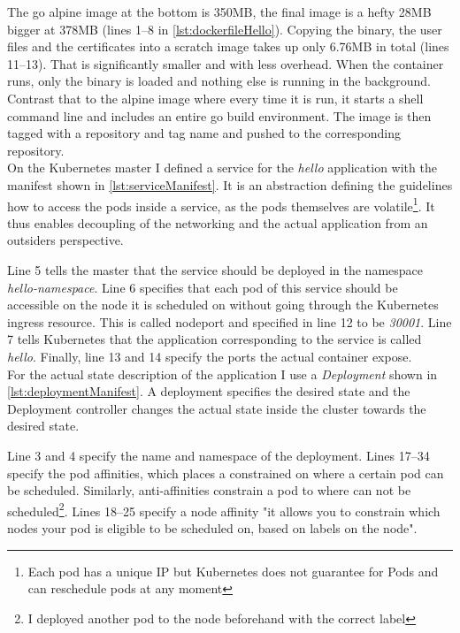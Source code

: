 The go alpine image at the bottom is 350MB, the final image is a hefty 28MB bigger at 378MB (lines 1--8 in \cref{lst:dockerfileHello}). Copying the binary, the user files and the  certificates into a scratch image takes up only 6.76MB in total (lines 11--13). That is significantly smaller and with less overhead. When the container runs, only the binary is loaded and nothing else is running in the background. Contrast that to the alpine image where every time it is run, it starts a shell command line and includes an entire go build environment. The image is then tagged with a repository and tag name and pushed to the corresponding repository.\\
On the Kubernetes master I defined a service for the \textit{hello} application with the manifest shown in \cref{lst:serviceManifest}. It is an abstraction defining the guidelines how to access the pods inside a service, as the pods themselves are volatile\footnote{Each pod has a unique IP but Kubernetes does not guarantee for Pods and can reschedule pods at any moment}. It thus enables decoupling of the networking and the actual application from an outsiders perspective.

Line 5 tells the master that the service should be deployed in the namespace \textit{hello-namespace}. Line 6 specifies that each pod of this service should be accessible on the node it is scheduled on without going through the Kubernetes ingress resource. This is called nodeport and specified in line 12 to be \textit{30001}. Line 7 tells Kubernetes that the application corresponding to the service is called \textit{hello}. Finally, line 13 and 14 specify the ports the actual container expose.\\
For the actual state description of the application I use a \textit{Deployment} shown in \cref{lst:deploymentManifest}. A deployment specifies the desired state and the Deployment controller changes the actual state inside the cluster towards the desired state. 

Line 3 and 4 specify the name and namespace of the deployment. Lines 17--34 specify the pod affinities, which places a constrained on where a certain pod can be scheduled. Similarly, anti-affinities constrain a pod to where can not be scheduled\footnote{I deployed another pod to the node beforehand with the correct label}. Lines 18--25 specify a node affinity "it allows you to constrain which nodes your pod is eligible to be scheduled on, based on labels on the node"\cite{affinitiesKubernetes:online}.
